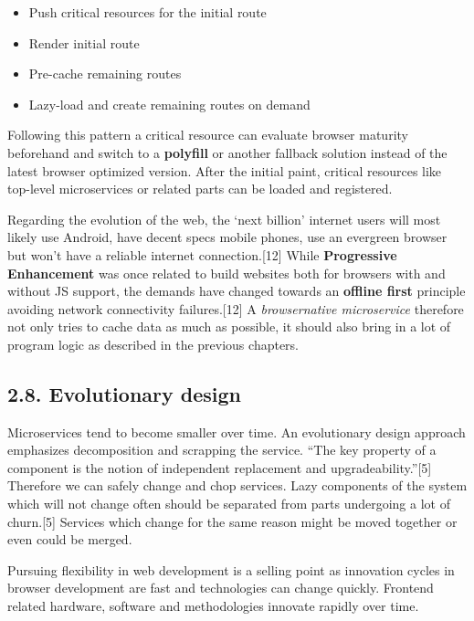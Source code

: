 \documentclass[]{article}
\providecommand{\tightlist}{%
  \setlength{\itemsep}{0pt}\setlength{\parskip}{0pt}}
\begin{document}
\begin{itemize}
\tightlist
\item
  Push critical resources for the initial route
\item
  Render initial route
\item
  Pre-cache remaining routes
\item
  Lazy-load and create remaining routes on demand
\end{itemize}

Following this pattern a critical resource can evaluate browser maturity
beforehand and switch to a \textbf{polyfill} or another fallback
solution instead of the latest browser optimized version. After the
initial paint, critical resources like top-level microservices or
related parts can be loaded and registered.

Regarding the evolution of the web, the `next billion' internet users
will most likely use Android, have decent specs mobile phones, use an
evergreen browser but won't have a reliable internet connection.{[}12{]}
While \textbf{Progressive Enhancement} was once related to build
websites both for browsers with and without JS support, the demands have
changed towards an \textbf{offline first} principle avoiding network
connectivity failures.{[}12{]} A \emph{browsernative microservice}
therefore not only tries to cache data as much as possible, it should
also bring in a lot of program logic as described in the previous
chapters.

\subsection{2.8. Evolutionary design}\label{evolutionary-design}

Microservices tend to become smaller over time. An evolutionary design
approach emphasizes decomposition and scrapping the service. ``The key
property of a component is the notion of independent replacement and
upgradeability.''{[}5{]} Therefore we can safely change and chop
services. Lazy components of the system which will not change often
should be separated from parts undergoing a lot of churn.{[}5{]}
Services which change for the same reason might be moved together or
even could be merged.

Pursuing flexibility in web development is a selling point as innovation
cycles in browser development are fast and technologies can change
quickly. Frontend related hardware, software and methodologies innovate
rapidly over time.
\end{document}
